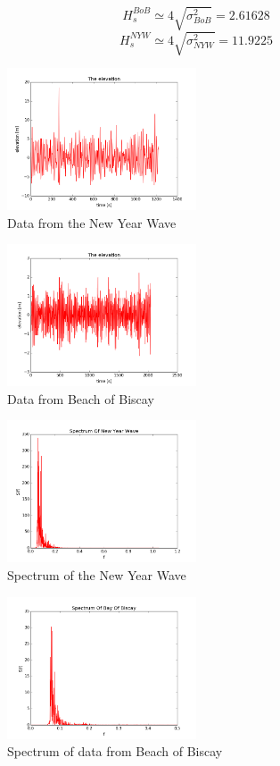 \documentclass[12pt]{article}
\begin{document}
$$ H_s^{BoB} \simeq 4 \sqrt{\sigma_{BoB}^2} = 2.61628 $$
$$ H_s^{NYW} \simeq 4 \sqrt{\sigma_{NYW}^2} = 11.9225 $$
\begin{figure}
  \caption{Data from the New Year Wave}
  \centering
    \includegraphics[width=0.5\textwidth]{NewYearWave.png}
\end{figure}
\begin{figure}
  \caption{Data from Beach of Biscay}
  \centering
    \includegraphics[width=0.5\textwidth]{BayOfBiscay.png}
\end{figure}
\begin{figure}
  \caption{Spectrum of the New Year Wave}
  \centering
    \includegraphics[width=0.5\textwidth]{SpectrumOfNewYearWave.png}
\end{figure}
\begin{figure}
  \caption{Spectrum of data from Beach of Biscay}
  \centering
    \includegraphics[width=0.5\textwidth]{SpectrumOfBayOfBiscay.png}
\end{figure} 
\end{document}
